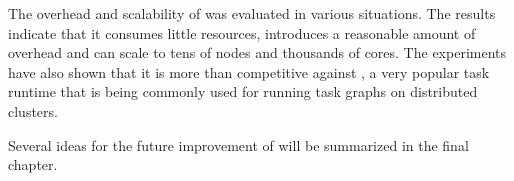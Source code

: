 The overhead and scalability of \hyperqueue{} was evaluated in various situations. The
results indicate that it consumes little resources, introduces a reasonable amount of overhead and
can scale to tens of nodes and thousands of cores. The experiments have also shown that it is more
than competitive against \dask{}, a very popular task runtime that is being
commonly used for running task graphs on distributed clusters.

Several ideas for the future improvement of \hyperqueue{} will be summarized in the final
chapter.
